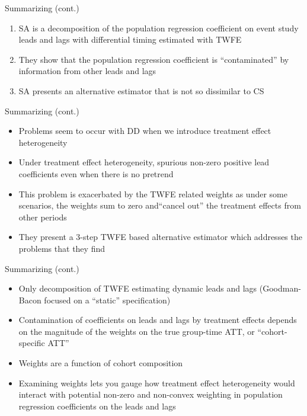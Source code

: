 \documentclass{beamer}
\begin{document}
\begin{frame}{Summarizing (cont.)}

	\begin{enumerate}
	\item SA is a decomposition of the population regression coefficient on event study leads and lags with differential timing estimated with TWFE
	\item They show that the population regression coefficient is ``contaminated'' by information from other leads and lags
	\item SA presents an alternative estimator that is not so dissimilar to CS
	\end{enumerate}

\end{frame}

\begin{frame}{Summarizing (cont.)}

\begin{itemize}
\item Problems seem to occur with DD when we introduce treatment effect heterogeneity
\item Under treatment effect heterogeneity, spurious non-zero positive lead coefficients even when there is no pretrend
\item This problem is exacerbated by the TWFE related weights as under some scenarios, the weights sum to zero and``cancel out'' the treatment effects from other periods 
\item They present a 3-step TWFE based alternative estimator which addresses the problems that they find
\end{itemize}

\end{frame}

\begin{frame}{Summarizing (cont.)}

\begin{itemize}
\item Only decomposition of TWFE estimating dynamic leads and lags (Goodman-Bacon focused on a ``static'' specification)
\item Contamination of coefficients on leads and lags by treatment effects depends on the magnitude of the weights on the true group-time ATT, or ``cohort-specific ATT''
\item Weights are a function of cohort composition
\item Examining weights lets you gauge how treatment effect heterogeneity would interact with potential non-zero and non-convex weighting in population regression coefficients on the leads and lags
\end{itemize}

\end{frame}
\end{document}
